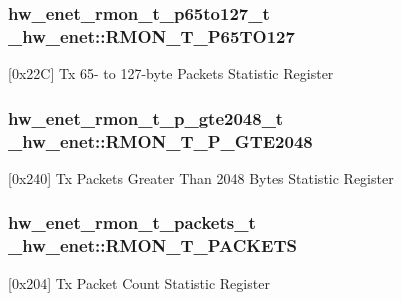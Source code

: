 \subsubsection[{\texorpdfstring{R\+M\+O\+N\+\_\+\+T\+\_\+\+P65\+T\+O127}{RMON_T_P65TO127}}]{ {\bf hw\+\_\+enet\+\_\+rmon\+\_\+t\+\_\+p65to127\+\_\+t} \+\_\+hw\+\_\+enet\+::\+R\+M\+O\+N\+\_\+\+T\+\_\+\+P65\+T\+O127}\hypertarget{struct__hw__enet_a3a9fde1c4521e3fb6bcd76623d38ac3c}{}\label{struct__hw__enet_a3a9fde1c4521e3fb6bcd76623d38ac3c}
\mbox{[}0x22C\mbox{]} Tx 65-\/ to 127-\/byte Packets Statistic Register 
\subsubsection[{\texorpdfstring{R\+M\+O\+N\+\_\+\+T\+\_\+\+P\+\_\+\+G\+T\+E2048}{RMON_T_P_GTE2048}}]{ {\bf hw\+\_\+enet\+\_\+rmon\+\_\+t\+\_\+p\+\_\+gte2048\+\_\+t} \+\_\+hw\+\_\+enet\+::\+R\+M\+O\+N\+\_\+\+T\+\_\+\+P\+\_\+\+G\+T\+E2048}\hypertarget{struct__hw__enet_a7a4a5372e7d34256b49ebdea5bd8989d}{}\label{struct__hw__enet_a7a4a5372e7d34256b49ebdea5bd8989d}
\mbox{[}0x240\mbox{]} Tx Packets Greater Than 2048 Bytes Statistic Register 
\subsubsection[{\texorpdfstring{R\+M\+O\+N\+\_\+\+T\+\_\+\+P\+A\+C\+K\+E\+TS}{RMON_T_PACKETS}}]{ {\bf hw\+\_\+enet\+\_\+rmon\+\_\+t\+\_\+packets\+\_\+t} \+\_\+hw\+\_\+enet\+::\+R\+M\+O\+N\+\_\+\+T\+\_\+\+P\+A\+C\+K\+E\+TS}\hypertarget{struct__hw__enet_a668335ec3c6a8258ec5877b29ae7b112}{}\label{struct__hw__enet_a668335ec3c6a8258ec5877b29ae7b112}
\mbox{[}0x204\mbox{]} Tx Packet Count Statistic Register 

